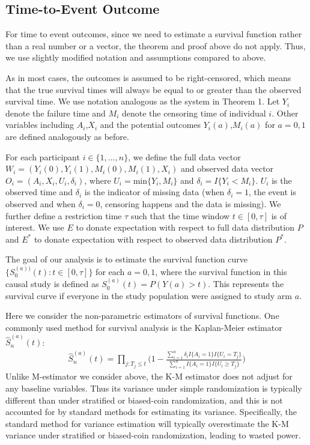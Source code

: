 \documentclass{article}
\begin{document}
\subsection{Time-to-Event Outcome}
For time to event outcomes, since we need to estimate a survival function rather than a real
number or a vector, the theorem and proof above do not
apply. Thus, we use slightly modified notation
and assumptions compared to above.

As in most cases, the outcomes is assumed to be right-censored, which means that the true survival times will always be equal to or greater than the observed survival time. We use notation analogous as the system in Theorem 1. Let $Y_i$ denote the failure time and $M_i$
denote the censoring time of individual $i$. Other variables including $A_i$,$X_i$ and the potential outcomes $Y_i(a)$,$M_i(a)$ for $a = 0, 1$ are defined analogously as before.

For each participant $i\in\{1,...,n\}$, we define the full data vector $W_i = (Y_i(0),Y_i(1),M_i(0),M_i(1),X_i)$ and observed data vector $O_i=(A_i,X_i,U_i,\delta_i)$, where $U_i =\mathrm{min}\{Y_i,M_i\}$ and $\delta_i=I\{Y_i<M_i\}$. $U_i$ is the observed time and $\delta_i$ is the indicator of missing data (when $\delta_i=1$, the event is observed and when $\delta_i =0$, censoring happens and the data is missing). We further define a restriction time $\tau$ such that the time window $t\in[0,\tau]$ is of interest. We use $E$ to donate expectation with respect to full data distribution $P$ and $E^*$ to donate expectation with respect to observed data distribution $P^*$.

The goal of our analysis is to estimate the survival function curve $\{S_0^{(a))}(t):t\in[0,\tau]\}$ for each $a=0,1$, where the survival function in this causal study is defined as $S_0^{(a)}(t)=P(Y(a)>t)$. This
represents the survival curve if everyone in the study population were assigned to study arm $a$.

Here we consider the non-parametric estimators of survival functions. One commonly used method for survival analysis is the Kaplan-Meier
estimator $\hat{S}_n^{(a)}(t)$:
\begin{align}
    \hat{S}_n^{(a)}(t)=\prod_{j:T_j \leq t}\Big( 1-\frac{\sum_{i=1}^n \delta_i I\{A_i=1\}I\{U_i=T_j\}}{\sum_{i=1}^n I\{A_i=1\}I\{U_i\geq T_j\}} \Big)
\end{align}
Unlike M-estimator we consider above, the K-M estimator does not adjust for any baseline
variables. Thus its variance under simple randomization is typically
different than under stratified or biased-coin randomization,
and this is not accounted for by standard methods for estimating
its variance. Specifically, the standard method for variance estimation will
typically overestimate the K-M variance under stratified
or biased-coin randomization, leading to wasted power.
\end{document}
